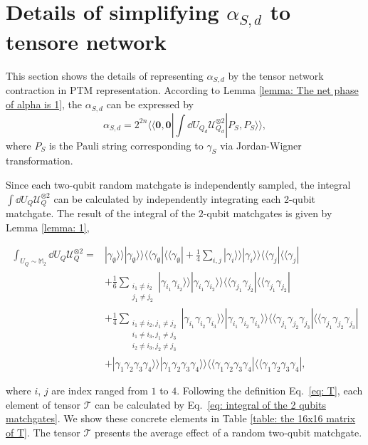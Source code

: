 \documentclass[showpacs,twocolumn,aps,prx,long bibliography,superscriptaddress,notitlepage]{revtex4-1}
\newcommand{\supket}[1]{|#1 \rangle\rangle}
\newcommand{\supbra}[1]{\langle\langle #1 |}
\newcommand{\supketbra}[2]{
    \supket{#1 } \supket{#1 } \supbra{#2} \supbra{#2} 
}
\newcommand{\Tcal}{\mathcal{T}}
\newcommand{\Mbb}{\mathbb{M}}
\begin{document}
\section{Details of simplifying $\alpha_{S,d}$ to tensore network}
\label{appendix 3}
 This section shows the details of representing $\alpha_{S,d}$ by the tensor network contraction in PTM representation. According to Lemma \ref{lemma: The net phase of alpha is 1}, the $\alpha_{S,d}$ can be expressed by 
 \begin{equation}
     \alpha_{S,d} = 2^{2n}  \supbra{\bm 0,\bm 0}  \int\dd U_{Q_d} \mathcal{U}_{Q_d}^{\otimes 2} \supket{P_S,P_S}, 
 \end{equation}
where $P_S$ is the Pauli string corresponding to $\gamma_S$ via Jordan-Wigner transformation. 

Since each two-qubit random matchgate is independently sampled, the integral $\int \dd U_Q \mathcal{U}_Q^{\otimes 2}$ can be calculated by independently integrating each 2-qubit matchgate. The result of the integral of the $2$-qubit matchgates is given by Lemma \ref{lemma: 1},
\begin{widetext}
    \begin{equation}
\label{eq: integral of the 2 qubits matchgates}
\begin{aligned}
    \int_{U_Q\sim \Mbb_2} \dd U_Q\mathcal{U}_Q^{\otimes 2} =& \supketbra{\gamma_\emptyset}{\gamma_\emptyset}
    + \frac{1}{4} \sum_{i,j} \supketbra{\gamma_i}{\gamma_j}\\
    &+ \frac{1}{6}\sum_{\substack{i_1\neq i_2 \\ j_1\neq j_2}}\supketbra{\gamma_{i_1}\gamma_{i_2}}{\gamma_{j_1}\gamma_{j_2}} \\
    &+ \frac{1}{4}
    \sum_{\substack{i_1\neq i_2, j_1 \neq j_2 \\ 
        i_1\neq i_3, j_1 \neq j_3 \\
        i_2\neq i_3, j_2 \neq j_3} 
    }
    \supketbra{\gamma_{i_1}\gamma_{i_2}\gamma_{i_3}}{\gamma_{j_1}\gamma_{j_2}\gamma_{j_3}}\\
    &+ \supketbra{\gamma_1\gamma_2\gamma_3\gamma_4}{\gamma_1\gamma_2\gamma_3\gamma_4},
\end{aligned}
\end{equation}
\end{widetext}

where $i$, $j$ are index ranged from $1$ to $4$. Following the definition Eq.~\eqref{eq: T}, each element of tensor $\Tcal$ can be calculated by Eq.~\eqref{eq: integral of the 2 qubits matchgates}.
We show these concrete elements in Table \ref{table: the 16x16 matrix of T}.  The tensor $\Tcal$ presents the average effect of a random two-qubit matchgate.
\end{document}
